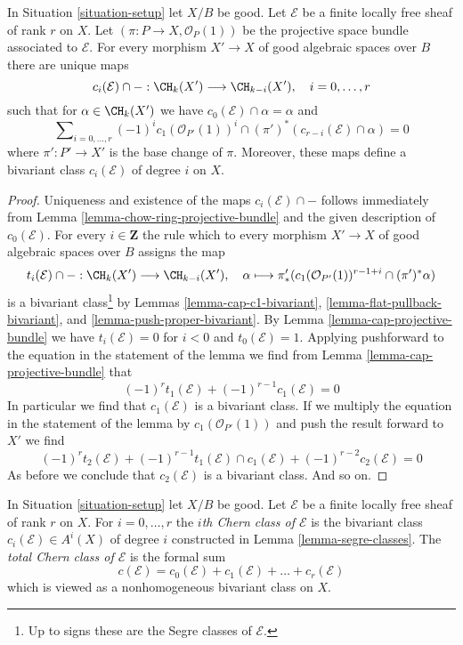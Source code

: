 \begin{lemma}
\label{lemma-segre-classes}
In Situation \ref{situation-setup} let $X/B$ be good.
Let $\mathcal{E}$ be a finite locally free sheaf of rank $r$ on $X$.
Let $(\pi : P \to X, \mathcal{O}_P(1))$ be the projective space
bundle associated to $\mathcal{E}$. For every
morphism $X' \to X$ of good algebraic spaces over $B$
there are unique maps
$$
c_i(\mathcal{E}) \cap - : \CH_k(X') \longrightarrow \CH_{k - i}(X'),\quad
i = 0, \ldots, r
$$
such that for $\alpha \in \CH_k(X')$ we have
$c_0(\mathcal{E}) \cap \alpha = \alpha$ and
$$
\sum\nolimits_{i = 0, \ldots, r}
(-1)^i c_1(\mathcal{O}_{P'}(1))^i \cap
(\pi')^*\left(c_{r - i}(\mathcal{E}) \cap \alpha\right) = 0
$$
where $\pi' : P' \to X'$ is the base change of $\pi$.
Moreover, these maps define a bivariant class
$c_i(\mathcal{E})$ of degree $i$ on $X$.
\end{lemma}

\begin{proof}
Uniqueness and existence of the maps $c_i(\mathcal{E}) \cap -$
follows immediately from Lemma \ref{lemma-chow-ring-projective-bundle}
and the given description of $c_0(\mathcal{E})$. For every $i \in \mathbf{Z}$
the rule which to every morphism $X' \to X$ of good algebraic spaces
over $B$ assigns the map
$$
t_i(\mathcal{E}) \cap - :
\CH_k(X') \longrightarrow \CH_{k - i}(X'),\quad
\alpha \longmapsto
\pi'_*(c_1(\mathcal{O}_{P'}(1))^{r - 1 + i} \cap (\pi')^*\alpha)
$$
is a bivariant class\footnote{Up to signs these are
the Segre classes of $\mathcal{E}$.} by Lemmas \ref{lemma-cap-c1-bivariant},
\ref{lemma-flat-pullback-bivariant}, and
\ref{lemma-push-proper-bivariant}.
By Lemma \ref{lemma-cap-projective-bundle} we have
$t_i(\mathcal{E}) = 0$ for $i < 0$ and $t_0(\mathcal{E}) = 1$.
Applying pushforward to the equation in the statement of the lemma
we find from Lemma \ref{lemma-cap-projective-bundle} that
$$
(-1)^r t_1(\mathcal{E}) + (-1)^{r - 1}c_1(\mathcal{E}) = 0
$$
In particular we find that $c_1(\mathcal{E})$ is a bivariant class.
If we multiply the equation in the statement of the lemma by
$c_1(\mathcal{O}_{P'}(1))$ and push the result forward to $X'$
we find
$$
(-1)^r t_2(\mathcal{E}) +
(-1)^{r - 1} t_1(\mathcal{E}) \cap c_1(\mathcal{E}) +
(-1)^{r - 2} c_2(\mathcal{E}) = 0
$$
As before we conclude that $c_2(\mathcal{E})$ is a bivariant class.
And so on.
\end{proof}

\begin{definition}
\label{definition-chern-classes}
In Situation \ref{situation-setup} let $X/B$ be good.
Let $\mathcal{E}$ be a finite locally free sheaf of rank $r$ on $X$.
For $i = 0, \ldots, r$ the {\it $i$th Chern class of $\mathcal{E}$}
is the bivariant class $c_i(\mathcal{E}) \in A^i(X)$ of degree $i$
constructed in Lemma \ref{lemma-segre-classes}.
The {\it total Chern class of $\mathcal{E}$}
is the formal sum
$$
c(\mathcal{E}) =
c_0(\mathcal{E}) + c_1(\mathcal{E}) + \ldots + c_r(\mathcal{E})
$$
which is viewed as a nonhomogeneous bivariant class on $X$.
\end{definition}

